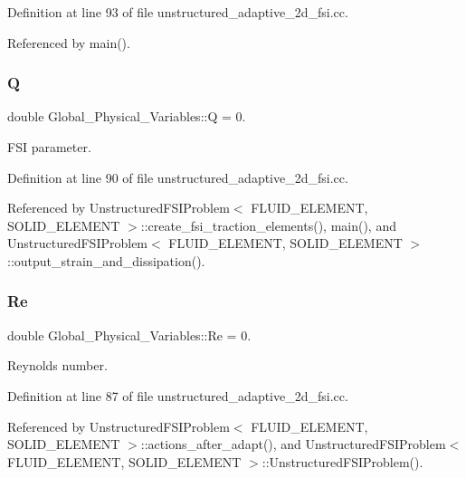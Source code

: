 Definition at line 93 of file unstructured\+\_\+adaptive\+\_\+2d\+\_\+fsi.\+cc.



Referenced by main().

\mbox{\label{namespaceGlobal__Physical__Variables_a66cb7ecda9ba0cd72367dd697f154545}} 
\subsubsection{\texorpdfstring{Q}{Q}}
{\footnotesize\ttfamily double Global\+\_\+\+Physical\+\_\+\+Variables\+::Q = 0.}



F\+SI parameter. 



Definition at line 90 of file unstructured\+\_\+adaptive\+\_\+2d\+\_\+fsi.\+cc.



Referenced by Unstructured\+F\+S\+I\+Problem$<$ F\+L\+U\+I\+D\+\_\+\+E\+L\+E\+M\+E\+N\+T, S\+O\+L\+I\+D\+\_\+\+E\+L\+E\+M\+E\+N\+T $>$\+::create\+\_\+fsi\+\_\+traction\+\_\+elements(), main(), and Unstructured\+F\+S\+I\+Problem$<$ F\+L\+U\+I\+D\+\_\+\+E\+L\+E\+M\+E\+N\+T, S\+O\+L\+I\+D\+\_\+\+E\+L\+E\+M\+E\+N\+T $>$\+::output\+\_\+strain\+\_\+and\+\_\+dissipation().

\mbox{\label{namespaceGlobal__Physical__Variables_ab814e627d2eb5bc50318879d19ab16b9}} 
\subsubsection{\texorpdfstring{Re}{Re}}
{\footnotesize\ttfamily double Global\+\_\+\+Physical\+\_\+\+Variables\+::\+Re = 0.}



Reynolds number. 



Definition at line 87 of file unstructured\+\_\+adaptive\+\_\+2d\+\_\+fsi.\+cc.



Referenced by Unstructured\+F\+S\+I\+Problem$<$ F\+L\+U\+I\+D\+\_\+\+E\+L\+E\+M\+E\+N\+T, S\+O\+L\+I\+D\+\_\+\+E\+L\+E\+M\+E\+N\+T $>$\+::actions\+\_\+after\+\_\+adapt(), and Unstructured\+F\+S\+I\+Problem$<$ F\+L\+U\+I\+D\+\_\+\+E\+L\+E\+M\+E\+N\+T, S\+O\+L\+I\+D\+\_\+\+E\+L\+E\+M\+E\+N\+T $>$\+::\+Unstructured\+F\+S\+I\+Problem().

